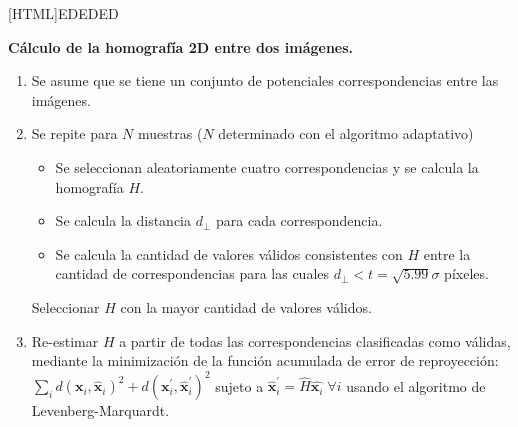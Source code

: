 [HTML]{EDEDED}{\parbox{365pt}{%
\noindent \textbf{Cálculo de la homografía 2D entre dos imágenes.}
\begin{enumerate}[nolistsep]
 \item Se asume que se tiene un conjunto de potenciales correspondencias entre las imágenes.
 \item Se repite para $N$ muestras ($N$ determinado con el algoritmo adaptativo)
  \begin{itemize}
    \item Se seleccionan aleatoriamente cuatro correspondencias y se calcula la homografía $\textit{H}$.
    \item Se calcula la distancia $d_{\perp}$ para cada correspondencia.
    \item Se calcula la cantidad de valores válidos consistentes con $\textit{H}$ entre la cantidad de correspondencias para las cuales $d_{\perp}<t=\sqrt{5.99}\sigma$ píxeles.
  \end{itemize}
  Seleccionar $\textit{H}$ con la mayor cantidad de valores válidos. 
 \item Re-estimar $\textit{H}$ a partir de todas las correspondencias clasificadas como válidas, mediante la minimización de la función acumulada de error de reproyección: $\underset{i}{\sum}d(\mathbf{x}_{i},\hat{\mathbf{x}}_{i})^{2}+d(\mathbf{x}_{i}^{\prime},\hat{\mathbf{x}}_{i}^{\prime})^{2}$ sujeto a $\hat{\mathbf{x}}_{i}^\prime=\hat{\textit{H}}\hat{\mathbf{x}_i}\; \forall i$ usando el algoritmo de Levenberg-Marquardt.
\end{enumerate}}}